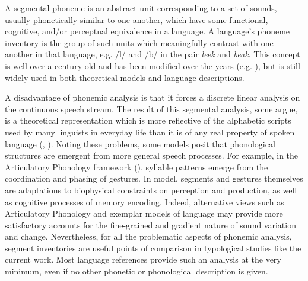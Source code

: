   A segmental phoneme is an abstract unit corresponding to a set of sounds, usually phonetically similar to one another, which have some functional, cognitive, and/or perceptual equivalence in a language. A language’s phoneme inventory is the group of such units which meaningfully contrast with one another in that language, e.g. /l/ and /b/ in the  pair \textit{leek} and \textit{beak}. This concept is well over a century old and has been modified over the years (e.g. \citealt{Sapir1925,ChomskyHalle1968}), but is still widely used in both theoretical models and language descriptions. 

  A disadvantage of phonemic analysis is that it forces a discrete linear analysis on the continuous speech stream. The result of this segmental analysis, some argue, is a theoretical representation which is more reflective of the alphabetic scripts used by many linguists in everyday life than it is of any real property of spoken language (\citealt{Port2006},  \citealt{MorenoCabrera2008}). Noting these problems, some models posit that phonological structures are emergent from more general speech processes. For example, in the Articulatory Phonology framework (\citealt{BrowmanGoldstein1992b}), syllable patterns emerge from the coordination and phasing of gestures. In  model, segments and gestures themselves are adaptations to biophysical constraints on perception and production, as well as cognitive processes of memory encoding. Indeed, alternative views such as Articulatory Phonology and exemplar models of language \citep{Bybee2001} may provide more satisfactory accounts for the fine-grained and gradient nature of sound variation and change. Nevertheless, for all the problematic aspects of phonemic analysis, segment inventories are useful points of comparison in typological studies like the current work. Most language references provide such an analysis at the very minimum, even if no other phonetic or phonological description is given.


